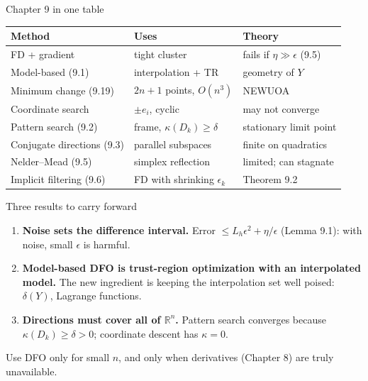 \documentclass[12pt,aspectratio=169]{beamer}
\newcommand{\eps}{\epsilon}
\newcommand{\R}{\mathbb{R}}
\begin{document}
\begin{frame}{Chapter 9 in one table}
  \centering
  \renewcommand{\arraystretch}{1.1}
  \begin{tabular}{lll}
    \toprule
    Method & Uses & Theory\\
    \midrule
    FD + gradient & tight cluster & fails if $\eta\gg\eps$ (9.5)\\
    Model-based (9.1) & interpolation + TR & geometry of $Y$\\
    Minimum change (9.19) & $2n+1$ points, $O(n^3)$ & NEWUOA\\
    Coordinate search & $\pm e_i$, cyclic & may not converge\\
    Pattern search (9.2) & frame, $\kappa(D_k)\ge\delta$ & stationary limit point\\
    Conjugate directions (9.3) & parallel subspaces & finite on quadratics\\
    Nelder--Mead (9.5) & simplex reflection & limited; can stagnate\\
    Implicit filtering (9.6) & FD with shrinking $\eps_k$ & Theorem 9.2\\
    \bottomrule
  \end{tabular}
\end{frame}

\begin{frame}{Three results to carry forward}
  \begin{enumerate}
    \item \textbf{Noise sets the difference interval.}
      Error $\le L_h\eps^2+\eta/\eps$ (Lemma 9.1): with noise, small $\eps$ is harmful.
    \item \textbf{Model-based DFO is trust-region optimization with an interpolated model.}
      The new ingredient is keeping the interpolation set well poised: $\delta(Y)$, Lagrange functions.
    \item \textbf{Directions must cover all of $\R^n$.}
      Pattern search converges because $\kappa(D_k)\ge\delta>0$; coordinate descent has $\kappa=0$.
  \end{enumerate}
  \vspace{1ex}
  Use DFO only for small $n$, and only when derivatives (Chapter 8) are truly unavailable.
\end{frame}
\end{document}
